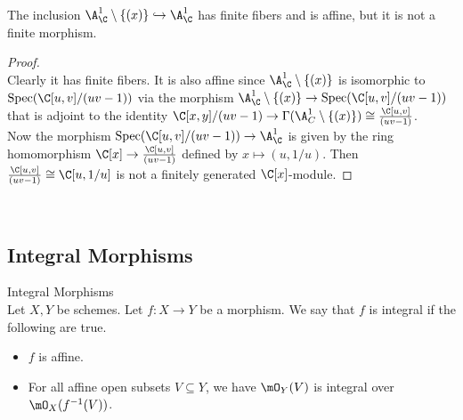 \documentclass[a4paper]{article}
\begin{document}
\begin{eg}{}{}\\
The inclusion $\A_\C^1\setminus\{(x)\}\hookrightarrow\A_\C^1$ has finite fibers and is affine, but it is not a finite morphism. 
\begin{proof}\\
Clearly it has finite fibers. It is also affine since $\A_\C^1\setminus\{(x)\}$ is isomorphic to $\text{Spec}(\C[u,v]/(uv-1))$ via the morphism $\A_\C^1\setminus\{(x)\}\to\text{Spec}(\C[u,v]/(uv-1))$ that is adjoint to the identity $\C[x,y]/(uv-1)\to\Gamma(\A_C^1\setminus\{(x)\})\cong\frac{\C[u,v]}{(uv-1)}$. \\

Now the morphism $\text{Spec}(\C[u,v]/(uv-1))\to\A_\C^1$ is given by the ring homomorphism $\C[x]\to\frac{\C[u,v]}{(uv-1)}$ defined by $x\mapsto(u,1/u)$. Then $\frac{\C[u,v]}{(uv-1)}\cong\C[u,1/u]$ is not a finitely generated $\C[x]$-module. 
\end{proof}
\end{eg}

\\

\subsection{Integral Morphisms}
\begin{defn}{Integral Morphisms}{}\\
Let $X,Y$ be schemes. Let $f:X\to Y$ be a morphism. We say that $f$ is integral if the following are true. 
\begin{itemize}
\item $f$ is affine. 
\item For all affine open subsets $V\subseteq Y$, we have $\mO_Y(V)$ is integral over $\mO_X(f^{-1}(V))$. 
\end{itemize}
\end{defn}
\end{document}
